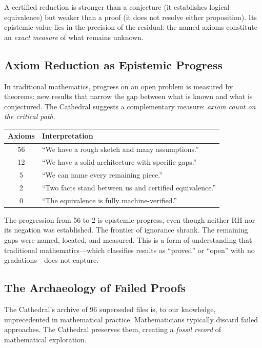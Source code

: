 \documentclass[11pt,a4paper]{article}
\newcommand{\RH}{\ensuremath{\mathrm{RH}}}
\begin{document}
A certified reduction is stronger than a conjecture (it establishes
logical equivalence) but weaker than a proof (it does not resolve
either proposition). Its epistemic value lies in the precision of
the residual: the named axioms constitute an \emph{exact measure}
of what remains unknown.

\subsection{Axiom Reduction as Epistemic Progress}

In traditional mathematics, progress on an open problem is measured
by theorems: new results that narrow the gap between what is known
and what is conjectured. The Cathedral suggests a complementary
measure: \emph{axiom count on the critical path}.

\begin{center}
\begin{tabular}{@{}cl@{}}
\toprule
\textbf{Axioms} & \textbf{Interpretation} \\
\midrule
56 & ``We have a rough sketch and many assumptions.'' \\
12 & ``We have a solid architecture with specific gaps.'' \\
5 & ``We can name every remaining piece.'' \\
2 & ``Two facts stand between us and certified equivalence.'' \\
0 & ``The equivalence is fully machine-verified.'' \\
\bottomrule
\end{tabular}
\end{center}

The progression from 56 to 2 is epistemic progress, even though
neither \RH{} nor its negation was established. The frontier of
ignorance shrank. The remaining gaps were named, located, and
measured. This is a form of understanding that traditional
mathematics---which classifies results as ``proved'' or ``open''
with no gradations---does not capture.

\subsection{The Archaeology of Failed Proofs}

The Cathedral's archive of 96 superseded files is, to our knowledge,
unprecedented in mathematical practice. Mathematicians typically
discard failed approaches. The Cathedral preserves them, creating a
\emph{fossil record} of mathematical exploration.
\end{document}
